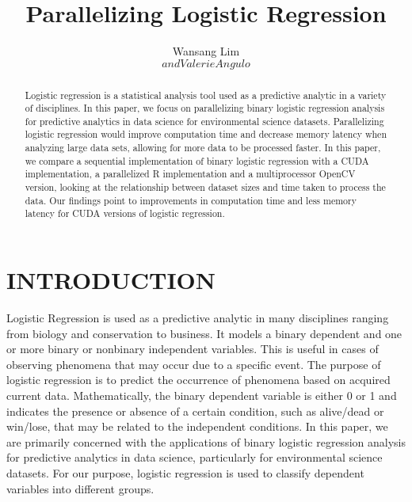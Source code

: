 \documentclass[letterpaper, 10 pt, conference]{ieeeconf}  %
\title{\LARGE \bf
Parallelizing Logistic Regression
}
\author{Wansang Lim$$ and Valerie Angulo$$%
}
\begin{document}
\maketitle
\thispagestyle{empty}
\pagestyle{empty}


\begin{abstract}
  Logistic regression is a statistical analysis tool used as a predictive analytic in a variety of disciplines. In this paper, we focus on parallelizing binary logistic regression analysis for predictive analytics in data science for environmental science datasets. Parallelizing logistic regression would improve computation time and decrease memory latency when analyzing large data sets, allowing for more data to be processed faster. In this paper, we compare a sequential implementation of binary logistic regression with a CUDA implementation, a parallelized R implementation and a multiprocessor OpenCV version, looking at the relationship between dataset sizes and time taken to process the data. Our findings point to improvements in computation time and less memory latency for CUDA versions of logistic regression.

\end{abstract}


\section{INTRODUCTION}

Logistic Regression is used as a predictive analytic in many disciplines ranging from biology and conservation to business. It models a binary dependent and one or more binary or nonbinary independent variables. This is useful in cases of observing phenomena that may occur due to a specific event. The purpose of logistic regression is to predict the occurrence of phenomena based on acquired current data. Mathematically, the binary dependent variable is either 0 or 1 and indicates the presence or absence of a certain condition, such as alive/dead or win/lose, that may be related to the independent conditions. In this paper, we are primarily concerned with the applications of binary logistic regression analysis for predictive analytics in data science, particularly for environmental science datasets. For our purpose, logistic regression is used to classify dependent variables into different groups.
\end{document}
